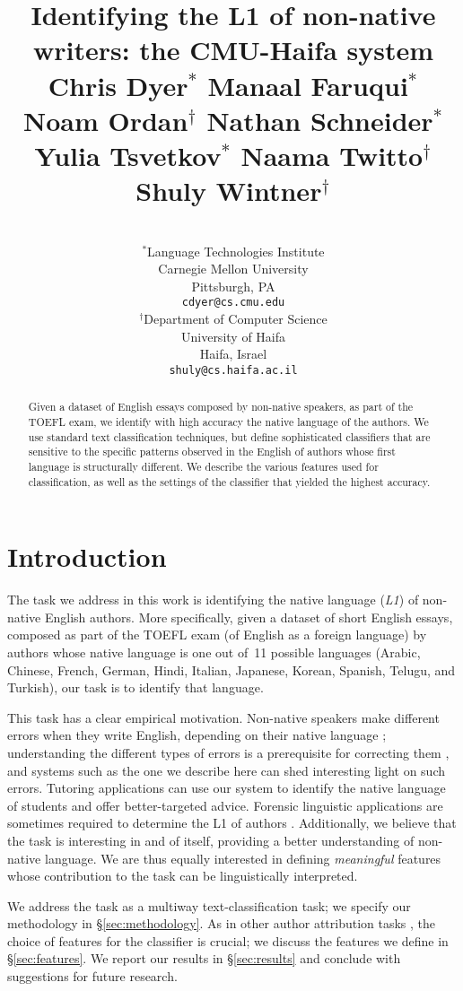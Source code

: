 \documentclass[11pt,letterpaper]{article}
\title{Identifying the L1 of non-native writers: the CMU-Haifa system\\[1em]
{\large Chris Dyer$^\ast$ Manaal Faruqui$^\ast$ Noam Ordan$^\dagger$ Nathan Schneider$^\ast$\\ Yulia Tsvetkov$^\ast$ Naama Twitto$^\dagger$ Shuly Wintner$^\dagger$}\\[-3em]
}
\author{
\\
$^\ast$Language Technologies Institute\\Carnegie Mellon University\\Pittsburgh, PA\\\texttt{cdyer@cs.cmu.edu}
\And
\\
$^\dagger$Department of Computer Science\\University of Haifa\\Haifa, Israel\\\texttt{shuly@cs.haifa.ac.il}
%
%
%
%
}
\date{}
\newcommand{\Sref}[1]{\S\ref{#1}}
\begin{document}
\maketitle
\begin{abstract}
Given a dataset of English essays composed by non-native speakers, as
part of the TOEFL exam, we identify with high accuracy the native
language of the authors. We use standard text classification
techniques, but define sophisticated classifiers that are sensitive to
the specific patterns observed in the English of authors whose first
language is structurally different. We describe the various features
used for classification, as well as the settings of the classifier
that yielded the highest accuracy.
\end{abstract}

\section{Introduction}
\label{sec:intro}
The task we address in this work is identifying the native language
(\emph{L1}) of non-native English authors. More specifically, given a
dataset
\citep{blanchard-tetreault-higgins-cahill-chodorow:2013:TOEFL11-RR} of
short English essays, composed as part of the TOEFL exam (of English
as a foreign language) by authors whose native language is one out
of~11 possible languages (Arabic, Chinese, French, German, Hindi,
Italian, Japanese, Korean, Spanish, Telugu, and Turkish), our task is
to identify that language.

This task has a clear empirical motivation. Non-native speakers make
different errors when they write English, depending on their native
language \citep{swan2001learner}; understanding the different types of
errors is a prerequisite for correcting them
\citep{Leacock:2010:AGE:1855062}, and systems such as the one we
describe here can shed interesting light on such errors. Tutoring
applications can use our system to identify the native language of
students and offer better-targeted advice. Forensic linguistic
applications are sometimes required to determine the L1 of authors
\citep{estival-gaustad-pham-radford-hutchinson:2007:ALTA2007,estival2007author}. Additionally,
we believe that the task is interesting in and of itself, providing a
better understanding of non-native language. We are thus equally
interested in defining \emph{meaningful} features whose contribution
to the task can be linguistically interpreted.

We address the task as a multiway text-classification task; we specify
our methodology in \Sref{sec:methodology}. As in other author
attribution tasks \citep{joula:2006}, the choice of features for the
classifier is crucial; we discuss the features we define in
\Sref{sec:features}. We report our results in
\Sref{sec:results} and conclude with suggestions for future
research.
\end{document}
